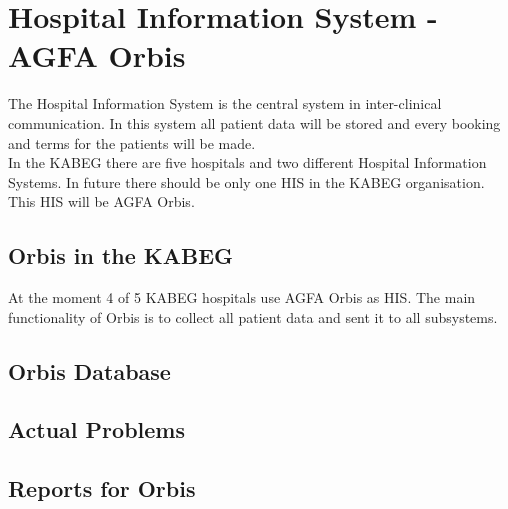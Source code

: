 \documentclass[a4paper]{article}
\begin{document}
	\newpage
	
	\section{Hospital Information System - AGFA Orbis}
	The Hospital Information System is the central system in inter-clinical
	communication. In this system all patient data will be stored and every booking
	and terms for the patients will be made.\\
	In the KABEG there are five hospitals and two different Hospital Information
	Systems. In future there should be only one HIS in the KABEG organisation. This
	HIS will be AGFA Orbis.
	\subsection{Orbis in the KABEG}
	At the moment 4 of 5 KABEG hospitals use AGFA Orbis as HIS. The main
	functionality of Orbis is to collect all patient data and sent it to all
	subsystems.
	\subsection{Orbis Database}
	\subsection{Actual Problems}
	\subsection{Reports for Orbis}
	
\end{document}
